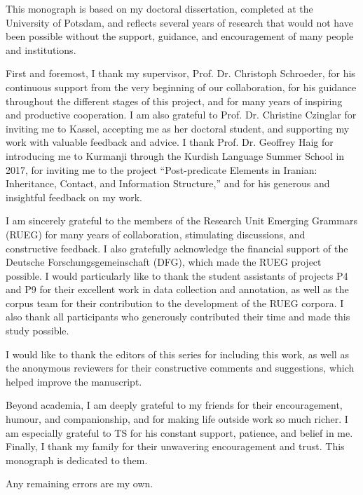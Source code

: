 \addchap{\lsAcknowledgementTitle}
\markdouble{\lsAcknowledgementTitle}
This monograph is based on my doctoral dissertation, completed at the University of Potsdam, and reflects several years of research that would not have been possible without the support, guidance, and encouragement of many people and institutions.

First and foremost, I thank my supervisor, Prof. Dr. Christoph Schroeder, for his continuous support from the very beginning of our collaboration, for his guidance throughout the different stages of this project, and for many years of inspiring and productive cooperation. I am also grateful to Prof. Dr. Christine Czinglar for inviting me to Kassel, accepting me as her doctoral student, and supporting my work with valuable feedback and advice. I thank Prof. Dr. Geoffrey Haig for introducing me to Kurmanji through the Kurdish Language Summer School in 2017, for inviting me to the project “Post-predicate Elements in Iranian: Inheritance, Contact, and Information Structure,” and for his generous and insightful feedback on my work.

I am sincerely grateful to the members of the Research Unit Emerging Grammars (RUEG) for many years of collaboration, stimulating discussions, and constructive feedback. I also gratefully acknowledge the financial support of the Deutsche Forschungsgemeinschaft (DFG), which made the RUEG project possible. I would particularly like to thank the student assistants of projects P4 and P9 for their excellent work in data collection and annotation, as well as the corpus team for their contribution to the development of the RUEG corpora. I also thank all participants who generously contributed their time and made this study possible.

I would like to thank the editors of this series for including this work, as well as the anonymous reviewers for their constructive comments and suggestions, which helped improve the manuscript.

Beyond academia, I am deeply grateful to my friends for their encouragement, humour, and companionship, and for making life outside work so much richer. I am especially grateful to TS for his constant support, patience, and belief in me. Finally, I thank my family for their unwavering encouragement and trust. This monograph is dedicated to them.

Any remaining errors are my own.

